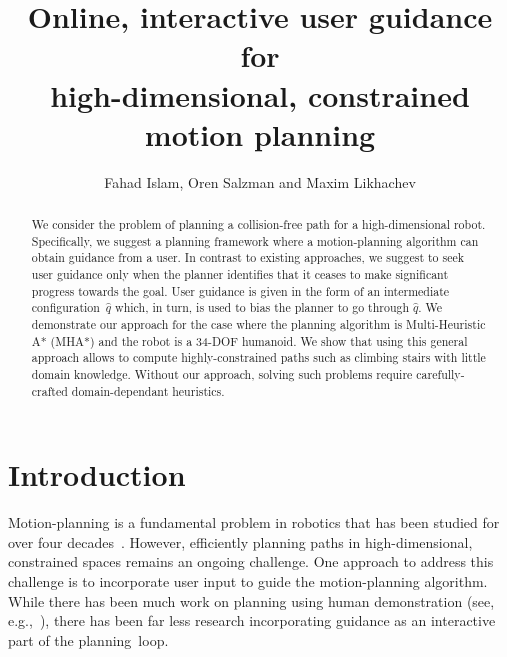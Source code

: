 \documentclass[conference]{IEEEtran}
\begin{document}
\title{	Online, interactive user guidance for \\
		high-dimensional, constrained motion planning }

\author{Fahad Islam, Oren Salzman and Maxim Likhachev}


\maketitle
\thispagestyle{empty}
\pagestyle{empty}



\begin{abstract}
We consider the problem of planning a collision-free path for a high-dimensional robot.
Specifically, we suggest a planning framework where a motion-planning algorithm can obtain guidance from a user.
In contrast to existing approaches, we suggest to seek user guidance only when the planner identifies that it ceases to make significant progress towards the goal.
User guidance is given in the form of an intermediate configuration~$\hat{q}$ which, in turn, is used to bias the planner to go through $\hat{q}$.
We demonstrate our approach for the case where the planning algorithm is Multi-Heuristic A* (MHA*) and the robot is a 34-DOF humanoid.
We show that using this general approach allows to compute highly-constrained paths such as climbing stairs with little domain knowledge.
Without our approach, solving such problems require carefully-crafted domain-dependant  heuristics. 
\end{abstract}

\IEEEpeerreviewmaketitle

\section{Introduction}
\label{sec:intro}

Motion-planning is a fundamental problem in robotics that has been studied for over four decades~\cite{CBHKKLT05,L06,S04}.
However, efficiently planning paths in high-dimensional, constrained spaces remains an ongoing challenge.
One approach to address this challenge is to incorporate user input to guide the motion-planning algorithm.
While there has been much work on planning using human demonstration 
(see, e.g.,~\cite{ACVB09, HS16, PHCL16, SHLA16, YA17}), 
there has been far less research incorporating guidance as an interactive part of the planning~loop.
\end{document}
